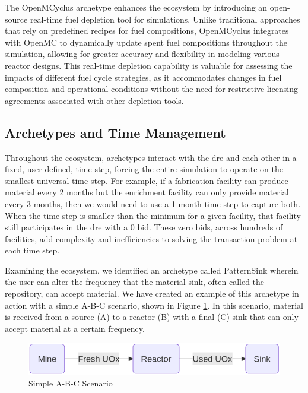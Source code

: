 The OpenMCyclus archetype \cite{openmcyclus_paper} enhances the \cyclus ecosystem by introducing an open-source real-time fuel depletion tool for \cyclus simulations. Unlike traditional approaches that rely on predefined recipes for fuel compositions, OpenMCyclus integrates with OpenMC \cite{romano_openmc_2015} to dynamically update spent fuel compositions throughout the simulation, allowing for greater accuracy and flexibility in modeling various reactor designs. This real-time depletion capability is valuable for assessing the impacts of different fuel cycle strategies, as it accommodates changes in fuel composition and operational conditions without the need for restrictive licensing agreements associated with other depletion tools.

\subsection{Archetypes and Time Management}
\label{sec:archetypes_and_time_management}

Throughout the \cyclus ecosystem, archetypes interact with the \gls{dre} and each other in a fixed, user defined, time step, forcing the entire simulation to operate on the smallest universal time step. For example, if a fabrication facility can produce material every 2 months but the enrichment facility can only provide material every 3 months, then we would need to use a 1 month time step to capture both. When the time step is smaller than the minimum for a given facility, that facility still participates in the \gls{dre} with a 0 bid. These zero bids, across hundreds of facilities, add complexity and inefficiencies to solving the transaction problem at each time step.

Examining the \cyclus ecosystem, we identified an archetype called PatternSink wherein the user can alter the frequency that the material sink, often called the repository, can accept material. We have created an example of this archetype in action with a simple A-B-C scenario, shown in Figure \ref{fig:a-b-c}. In this scenario, material is received from a source (A) to a reactor (B) with a final (C) sink that can only accept material at a certain frequency.

\begin{figure}[!ht]
    \centering
    \includegraphics[scale=0.4]{images/cyclus/a-b-c.png}
    \caption{Simple A-B-C Scenario}
    \label{fig:a-b-c}
\end{figure}

